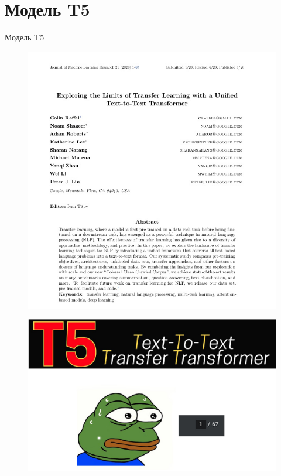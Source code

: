 \documentclass[aspectratio=169,xcolor=dvipsnames]{beamer}
\begin{document}
\section{Модель T5}

\begin{frame}{Модель T5}


\begin{figure}
\hspace{-7cm}
\includegraphics[scale=0.3]{t5.jpg}
\end{figure}

\begin{figure}
\vspace*{-5cm}
\hspace*{7cm}
\includegraphics[scale=0.6 ]{t52.jpg}
\end{figure}

\begin{center}
    
\end{center}



\end{frame}
\end{document}
